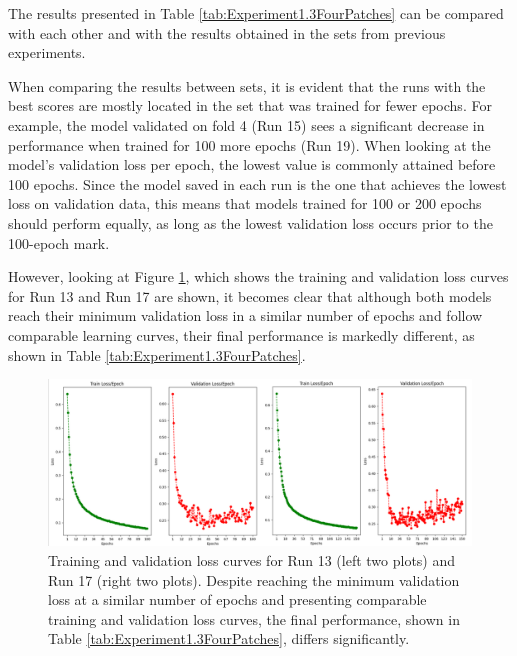 The results presented in Table \ref{tab:Experiment1.3FourPatches} can be compared with each other and with the results obtained in the sets from previous experiments. 
\par
When comparing the results between sets, it is evident that the runs with the best scores are mostly located in the set that was trained for fewer epochs. For example, the model validated on fold 4 (Run 15) sees a significant decrease in performance when trained for 100 more epochs (Run 19). When looking at the model's validation loss per epoch, the lowest value is commonly attained before 100 epochs. Since the model saved in each run is the one that achieves the lowest loss on validation data, this means that models trained for 100 or 200 epochs should perform equally, as long as the lowest validation loss occurs prior to the 100-epoch mark.
\par
However, looking at Figure \ref{fig:TrainingValidationLosses}, which shows the training and validation loss curves for Run 13 and Run 17 are shown, it becomes clear that although both models reach their minimum validation loss in a similar number of epochs and follow comparable learning curves, their final performance is markedly different, as shown in Table \ref{tab:Experiment1.3FourPatches}.

\begin{figure}[!ht]
	\centering
	\includegraphics[width=1.0\linewidth]{figures/TrainingValidationLosses.png}
	\caption{Training and validation loss curves for Run 13 (left two plots) and Run 17 (right two plots). Despite reaching the minimum validation loss at a similar number of epochs and presenting comparable training and validation loss curves, the final performance, shown in Table \ref{tab:Experiment1.3FourPatches}, differs significantly.}
	\label{fig:TrainingValidationLosses}
\end{figure}

